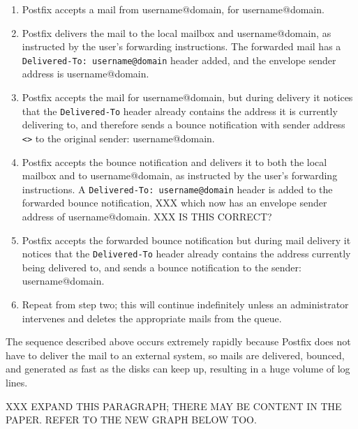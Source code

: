 \begin{enumerate}

    \item Postfix accepts a mail from username@domain, for username@domain.

    \item Postfix delivers the mail to the local mailbox and
        username@domain, as instructed by the user's forwarding
        instructions.  The forwarded mail has a
        \texttt{Delivered-To:~username@domain} header added, and the
        envelope sender address is username@domain.

    \item Postfix accepts the mail for username@domain, but during delivery
        it notices that the \texttt{Delivered-To} header already contains
        the address it is currently delivering to, and therefore sends a
        bounce notification with sender address \texttt{<>}\glsadd{<>} to
        the original sender: username@domain.

    \item Postfix accepts the bounce notification and delivers it to both
        the local mailbox and to username@domain, as instructed by the
        user's forwarding instructions.  A
        \texttt{Delivered-To:~username@domain} header is added to the
        forwarded bounce notification, XXX which now has an envelope sender
        address of username@domain.   XXX IS THIS CORRECT\@?

    \item Postfix accepts the forwarded bounce notification but during mail
        delivery it notices that the \texttt{Delivered-To} header already
        contains the address currently being delivered to, and sends a
        bounce notification to the sender: username@domain.

    \item Repeat from step two; this will continue indefinitely unless an
        administrator intervenes and deletes the appropriate mails from the
        queue.

\end{enumerate}

The sequence described above occurs extremely rapidly because Postfix does
not have to deliver the mail to an external system, so mails are delivered,
bounced, and generated as fast as the disks can keep up, resulting in a
huge volume of log lines.

XXX EXPAND THIS PARAGRAPH\@; THERE MAY BE CONTENT IN THE PAPER\@.  REFER TO
THE NEW GRAPH BELOW TOO\@.

